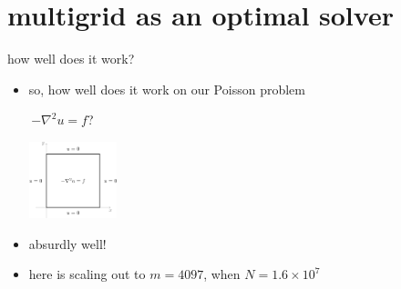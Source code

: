 \documentclass[10pt,
               svgnames,
               hyperref={colorlinks,citecolor=DeepPink4,linkcolor=FireBrick,urlcolor=Maroon},
               usepdftitle=false]{beamer}
\newcommand{\grad}{\nabla}
\begin{document}
\section{multigrid as an optimal solver}

\begin{frame}{how well does it work?}
\begin{itemize}
\item so, how well does it work on our Poisson problem

\,$-\grad^2 u=f$?

\vspace{-5mm}
\hfill \includegraphics[width=0.2\textwidth]{images/poisson.png}

\vspace{-13mm}
\item absurdly well!
\item here is scaling out to $m=4097$, when $N=1.6\times 10^7$
\end{itemize}


\end{frame}
\end{document}
